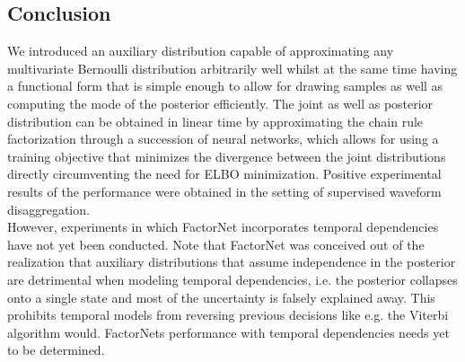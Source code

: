 \subsection{Conclusion}
We introduced an auxiliary distribution capable of approximating any multivariate Bernoulli distribution arbitrarily well whilst at the same time having a functional form that is simple enough to allow for drawing samples as well as computing the mode of the posterior efficiently. The joint as well as posterior distribution can be obtained in linear time by approximating the chain rule factorization through a succession of neural networks, which allows for using a training objective that minimizes the divergence between the joint distributions directly circumventing the need for ELBO minimization. Positive experimental results of the performance were obtained in the setting of supervised waveform disaggregation.\\
However, experiments in which FactorNet incorporates temporal dependencies have not yet been conducted. Note that FactorNet was conceived out of the realization that auxiliary distributions that assume independence in the posterior are detrimental when modeling temporal dependencies, i.e. the posterior collapses onto a single state and most of the uncertainty is falsely explained away. This prohibits temporal models from reversing previous decisions like e.g. the Viterbi~\cite{viterbi1967error} algorithm would. FactorNets performance with temporal dependencies needs yet to be determined.


